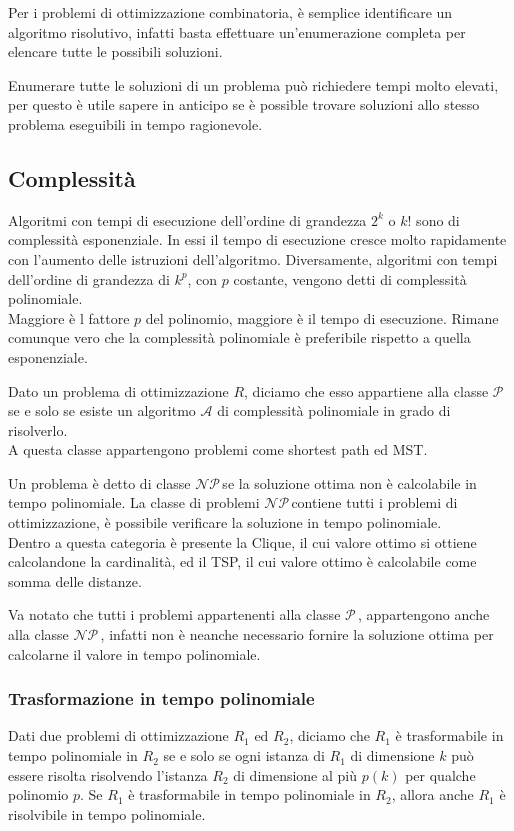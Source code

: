 \documentclass[../template]{subfiles}
\begin{document}
Per i problemi di ottimizzazione combinatoria, è semplice identificare un algoritmo risolutivo, infatti basta effettuare un'enumerazione completa per elencare tutte le possibili soluzioni.

Enumerare tutte le soluzioni di un problema può richiedere tempi molto elevati, per questo è utile sapere in anticipo se è possible trovare soluzioni allo stesso problema eseguibili in tempo ragionevole.

\subsection{Complessità}

Algoritmi con tempi di esecuzione dell'ordine di grandezza $2^k$ o $k!$ sono di complessità esponenziale. In essi il tempo di esecuzione cresce molto rapidamente con l'aumento delle istruzioni dell'algoritmo.
Diversamente, algoritmi con tempi dell'ordine di grandezza di $k^p$, con $p$ costante, vengono detti di complessità polinomiale.
\\
Maggiore è l fattore $p$ del polinomio, maggiore è il tempo di esecuzione. Rimane comunque vero che la complessità polinomiale è preferibile rispetto a quella esponenziale.


\def\np{\ensuremath{\mathcal{NP}\,}}
\def\p{\ensuremath{\mathcal{P}\,}}

Dato un problema di ottimizzazione $R$, diciamo che esso appartiene alla classe \p se e solo se esiste un algoritmo $\mathcal{A}$ di complessità polinomiale in grado di risolverlo.
\\
A questa classe appartengono problemi come shortest path ed MST.

Un problema è detto di classe \np se la soluzione ottima non è calcolabile in tempo polinomiale.
La classe di problemi \np contiene tutti i problemi di ottimizzazione, è possibile verificare la soluzione in tempo polinomiale.
\\
Dentro a questa categoria è presente la Clique, il cui valore ottimo si ottiene calcolandone la cardinalità, ed il TSP, il cui valore ottimo è calcolabile come somma delle distanze.

Va notato che tutti i problemi appartenenti alla classe \p, appartengono anche alla classe \np, infatti non è neanche necessario fornire la soluzione ottima per calcolarne il valore in tempo polinomiale.

\subsubsection{Trasformazione in tempo polinomiale}
Dati due problemi di ottimizzazione $R_1$ ed $R_2$, diciamo che $R_1$ è trasformabile in tempo polinomiale in $R_2$ se e solo se ogni istanza di $R_1$ di dimensione $k$ può essere risolta risolvendo l'istanza $R_2$ di dimensione al più $p(k)$ per qualche polinomio $p$.
Se $R_1$ è trasformabile in tempo polinomiale in $R_2$, allora anche $R_1$ è risolvibile in tempo polinomiale.
\end{document}
